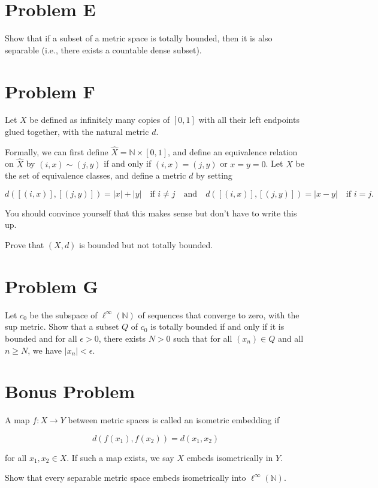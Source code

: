 \documentclass[lang=cn,11pt]{template}
\begin{document}
\section*{Problem E}
Show that if a subset of a metric space is totally bounded, then it is also separable (i.e., there exists a countable dense subset).

\section*{Problem F}
Let \( X \) be defined as infinitely many copies of \( [0, 1] \) with all their left endpoints glued together, with the natural metric \( d \).

Formally, we can first define \( \hat{X} = \mathbb{N} \times [0, 1] \), and define an equivalence relation on \( \hat{X} \) by \( (i, x) \sim (j, y) \) if and only if \( (i, x) = (j, y) \) or \( x = y = 0 \). Let \( X \) be the set of equivalence classes, and define a metric \( d \) by setting

\[
d([ (i, x) ], [ (j, y) ]) = |x| + |y| \quad \text{if } i \neq j \quad \text{and} \quad d([ (i, x) ], [ (j, y) ]) = |x - y| \quad \text{if } i = j.
\]

You should convince yourself that this makes sense but don’t have to write this up.

Prove that \( (X, d) \) is bounded but not totally bounded.

\section*{Problem G}
Let \( c_0 \) be the subspace of \( \ell^\infty(\mathbb{N}) \) of sequences that converge to zero, with the sup metric. Show that a subset \( Q \) of \( c_0 \) is totally bounded if and only if it is bounded and for all \( \epsilon > 0 \), there exists \( N > 0 \) such that for all \( (x_n) \in Q \) and all \( n \geq N \), we have \( |x_n| < \epsilon \).

\section*{Bonus Problem}
A map \( f: X \to Y \) between metric spaces is called an isometric embedding if

\[
d(f(x_1), f(x_2)) = d(x_1, x_2)
\]

for all \( x_1, x_2 \in X \). If such a map exists, we say \( X \) embeds isometrically in \( Y \).

Show that every separable metric space embeds isometrically into \( \ell^\infty(\mathbb{N}) \).
\end{document}
